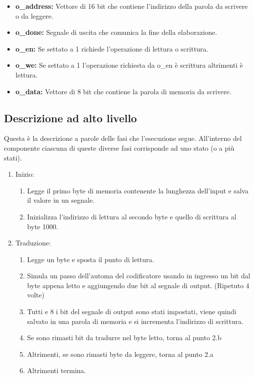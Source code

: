 \documentclass{article}
\begin{document}
\begin{itemize}
	\item \textbf{o\_address:} Vettore di 16 bit che contiene l'indirizzo della parola da scrivere o da leggere.
	\item \textbf{o\_done:} Segnale di uscita che comunica la fine della elaborazione.
	\item \textbf{o\_en:} Se settato a 1 richiede l'operazione di lettura o scrittura.
	\item \textbf{o\_we:} Se settato a 1 l'operazione richiesta da o\_en è scrittura altrimenti è lettura.
	\item \textbf{o\_data:} Vettore di 8 bit che contiene la parola di memoria da scrivere.
\end{itemize}
\pagebreak
\subsection{Descrizione ad alto livello}
Questa è la descrizione a parole delle fasi che l'esecuzione segue. All'interno del componente ciascuna di queste diverse fasi corrisponde ad uno stato (o a più stati).

\begin{enumerate}
	\item Inizio:
	\begin{enumerate}
		\item Legge il primo byte di memoria contenente la lunghezza dell'input e salva il valore in un segnale.
		\item Inizializza l'indirizzo di lettura al secondo byte e quello di scrittura al byte 1000.
	\end{enumerate}
	\item Traduzione:
	\begin{enumerate}
		\item Legge un byte e sposta il punto di lettura.
		\item Simula un passo dell'automa del codificatore usando in ingresso un bit dal byte appena letto e aggiungendo due bit al segnale di output. (Ripetuto 4 volte)
		\item Tutti e 8 i bit del segnale di output sono stati impostati, viene quindi salvato in una parola di memoria e si incrementa l'indirizzo di scrittura.
		\item Se sono rimasti bit da tradurre nel byte letto, torna al punto 2.b
		\item Altrimenti, se sono rimasti byte da leggere, torna al punto 2.a
		\item Altrimenti termina.
	\end{enumerate}
\end{enumerate}
\end{document}
